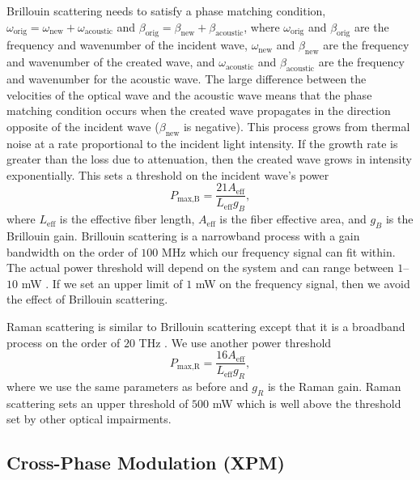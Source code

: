 Brillouin scattering needs to satisfy a phase matching condition, $\omega_{\text{orig}} = \omega_{\text{new}} + \omega_{\text{acoustic}}$ and $\beta_{\text{orig}} = \beta_{\text{new}} + \beta_{\text{acoustic}}$, where $\omega_{\text{orig}}$ and $\beta_{\text{orig}}$ are the frequency and wavenumber of the incident wave, $\omega_{\text{new}}$ and $\beta_{\text{new}}$ are the frequency and wavenumber of the created wave, and $\omega_{\text{acoustic}}$ and $\beta_{\text{acoustic}}$ are the frequency and wavenumber for the acoustic wave. The large difference between the velocities of the optical wave and the acoustic wave means that the phase matching condition occurs when the created wave propagates in the direction opposite of the incident wave ($\beta_{\text{new}}$ is negative). This process grows from thermal noise at a rate proportional to the incident light intensity. If the growth rate is greater than the loss due to attenuation, then the created wave grows in intensity exponentially. This sets a threshold on the incident wave's power \cite{Boyd2003, agrawal2012fiber}
%
\begin{equation}
P_{\text{max,B}} = \frac{21A_{\text{eff}}}{L_{\text{eff}}g_B},
\end{equation}
%
where $L_{\text{eff}}$ is the effective fiber length, $A_{\text{eff}}$ is the fiber effective area, and $g_B$ is the Brillouin gain. Brillouin scattering is a narrowband process with a gain bandwidth on the order of $100$ MHz which our frequency signal can fit within. The actual power threshold will depend on the system and can range between $1$--$10$ mW \cite{agrawal2012fiber}. If we set an upper limit of $1$ mW on the frequency signal, then we avoid the effect of Brillouin scattering.

Raman scattering is similar to Brillouin scattering except that it is a broadband process on the order of $20$ THz \cite{Boyd2003}. We use another power threshold \cite{agrawal2012fiber}
%
\begin{equation}
P_{\text{max,R}} = \frac{16A_{\text{eff}}}{L_{\text{eff}}g_R},
\end{equation}
%
where we use the same parameters as before and $g_R$ is the Raman gain. Raman scattering sets an upper threshold of $500$ mW which is well above the threshold set by other optical impairments.


\subsection{Cross-Phase Modulation (XPM)}


